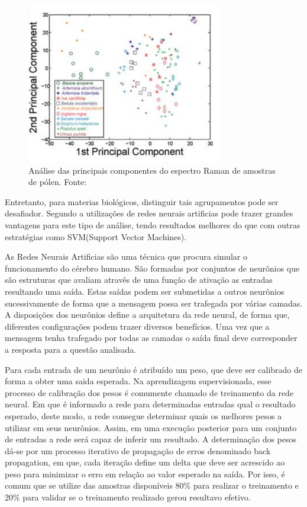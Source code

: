 \documentclass[conference,peerreview]{IEEEtran}
\begin{document}
\begin{figure}[ht]
\centering
\includegraphics[width=8.5cm]{pca_exemplo}
\caption{Análise das principais componentes do espectro Raman de amostras de pólen. Fonte: \cite{Seifert2016}}
\label{fg_exemp4}
\end{figure}

Entretanto, para materias biológicos, distinguir tais agrupamentos pode ser desafiador. Segundo \cite{Seifert2016} a utilizações de redes neurais artificias pode trazer grandes vantagens para este tipo de análise, tendo resultados melhores do que com outras estratégias como SVM(Support Vector Machines).

As Redes Neurais Artificias são uma técnica que procura simular o funcionamento do cérebro humano. São formadas por conjuntos de neurônios que são estruturas que avaliam atravês de uma função de ativação as entradas resultando uma saída. Estas saídas podem ser submetidas a outros neurônios sucessivamente de forma que a mensagem possa ser trafegada por várias camadas. A disposições dos neurônios define a arquitetura da rede neural, de forma que, diferentes configurações podem trazer diversos benefícios. Uma vez que a mensagem tenha trafegado por todas as camadas o saída final deve corresponder a resposta para a questão analisada.

Para cada entrada de um neurônio é atribuído um peso, que deve ser calibrado de forma a obter uma saida esperada. Na aprendizagem supervisionada, esse processo de calibração dos pesos é comumente chamado de treinamento da rede neural. Em que é informado a rede para determinadas entradas qual o resultado esperado, deste modo, a rede consegue determinar quais os melhores pesos a utilizar em seus neurônios. Assim, em uma execução posterior para um conjunto de entradas a rede será capaz de inferir um resultado. A determinação dos pesos dá-se por um processo iterativo de propagação de erros denominado back propagation, em que, cada iteração define um delta que deve ser acrescido ao peso para minimizar o erro em relação ao valor esperado na saída. Por isso, é comum que se utilize das amostras disponíveis 80\% para realizar o treinamento e 20\% para validar se o treinamento realizado gerou resultavo efetivo. 
\end{document}
